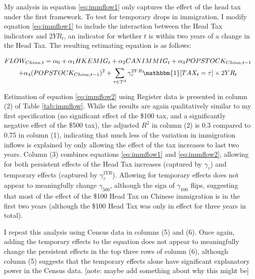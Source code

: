 My analysis in equation \ref{eq:immflow1} only captures the effect of the head tax under the first framework. To test for temporary drops in immigration, I modify equation \ref{eq:immflow1} to include the interaction between the Head Tax indicators and $2YR_t$, an indicator for whether $t$ is within two years of a change in the Head Tax. The resulting estimating equation is as follows: 

\begin{multline}
    \label{eq:immflow2}
    FLOW_{China,t} = \alpha_0 + \alpha_1 HKEMIG_t + \alpha_2 CANIMMIG_t + \alpha_3 POPSTOCK_{China, t-1} \\ + \alpha_4 (POPSTOCK_{China, t-1})^2 + \sum_{\tau \in \mathcal{T}^d} \gamma^{2YR}_\tau \mathbbm{1}[TAX_t = \tau]\times 2YR_t
\end{multline}

Estimation of equation \ref{eq:immflow2} using Register data is presented in column (2) of Table \ref{tab:immflow}. While the results are again qualitatively similar to my first specification (no significant effect of the \$100 tax, and a significantly negative effect of the \$500 tax), the adjusted $R^2$ in column (2) is 0.3 compared to 0.75 in column (1), indicating that much less of the variation in immigration inflows is explained by only allowing the effect of the tax increases to last two years. Column (3) combines equations \ref{eq:immflow1} and \ref{eq:immflow2}, allowing for both persistent effects of the Head Tax increases (captured by $\gamma_{\tau}$) and temporary effects (captured by $\gamma_{\tau}^{2YR}$). 
Allowing for temporary effects does not appear to meaningfully change $\gamma_{500}$, although the sign of $\gamma_{100}$ flips, suggesting that most of the effect of the \$100 Head Tax on Chinese immigration is in the first two years (although the \$100 Head Tax was only in effect for three years in total).

I repeat this analysis using Census data in columns (5) and (6). Once again, adding the temporary effects to the equation does not appear to meaningfully change the persistent effects in the top three rows of column (6), although column (5) suggests that the temporary effects alone have significant explanatory power in the Census data. [note: maybe add something about why this might be]

